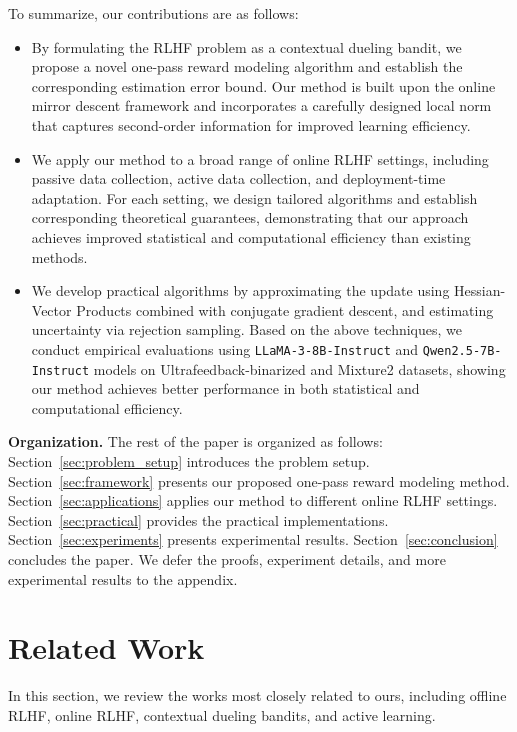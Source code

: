 To summarize, our contributions are as follows:
\begin{itemize}
    \item By formulating the RLHF problem as a contextual dueling bandit, we propose a novel one-pass reward modeling algorithm and establish the corresponding estimation error bound. Our method is built upon the online mirror descent framework and incorporates a carefully designed local norm that captures second-order information for improved learning efficiency.
    \item We apply our method to a broad range of online RLHF settings, including passive data collection, active data collection, and deployment-time adaptation. For each setting, we design tailored algorithms and establish corresponding theoretical guarantees, demonstrating that our approach achieves improved statistical and computational efficiency than existing methods.
    \item We develop practical algorithms by approximating the update using Hessian-Vector Products combined with conjugate gradient descent, and estimating uncertainty via rejection sampling. Based on the above techniques, we conduct empirical evaluations using \texttt{LLaMA-3-8B-Instruct} and \texttt{Qwen2.5-7B-Instruct} models on Ultrafeedback-binarized and Mixture2 datasets, showing our method achieves better performance in both statistical and computational efficiency.
\end{itemize}

\textbf{Organization.} The rest of the paper is organized as follows: Section~\ref{sec:problem_setup} introduces the problem setup. Section~\ref{sec:framework} presents our proposed one-pass reward modeling method. Section~\ref{sec:applications} applies our method to different online RLHF settings. Section~\ref{sec:practical} provides the practical implementations. Section~\ref{sec:experiments} presents experimental results. Section~\ref{sec:conclusion} concludes the paper. We defer the proofs, experiment details, and more experimental results to the appendix.


\section{Related Work}
\label{sec:related_work}

In this section, we review the works most closely related to ours, including offline RLHF, online RLHF, contextual dueling bandits, and active learning.


